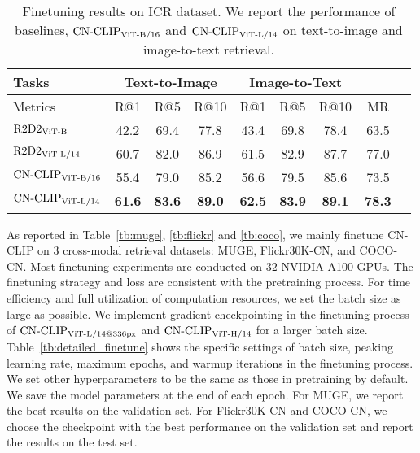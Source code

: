 \documentclass[11pt]{article}
\begin{document}
%
 \begin{table*}[t]
\center
\small
\begin{adjustbox}{max width=1.\textwidth}
\begin{tabular}{@{\extracolsep{\fill}}lcccccccc}
\toprule
  Tasks
  &\multicolumn{3}{c}{Text-to-Image}
  &\multicolumn{3}{c}{Image-to-Text}
  & 
  \\
\midrule
  Metrics & R@1 & R@5 & R@10 & R@1 & R@5 & R@10 & MR
  \\
\midrule
  $\text{R2D2}\rm_{ViT\text{-}B}$
  & 42.2    & 69.4  & 77.8	& 43.4	& 69.8	& 78.4 & 63.5
  \\
  $\text{R2D2}\rm_{ViT\text{-}L/14}$
  & 60.7    & 82.0  & 86.9  & 61.5  & 82.9  & 87.7  & 77.0
  \\
  $\text{CN-CLIP}\rm_{ViT\text{-}B/16}$
  & 55.4    & 79.0  & 85.2  & 56.6  & 79.5  & 85.6  & 73.5
  \\
  $\text{CN-CLIP}\rm_{ViT\text{-}L/14}$
  & \textbf{61.6}    & \textbf{83.6}  & \textbf{89.0}  & \textbf{62.5}  & \textbf{83.9}  & \textbf{89.1}  & \textbf{78.3}
  \\

\bottomrule
\end{tabular}
\end{adjustbox}
\caption{Finetuning results on ICR dataset. We report the performance of baselines, $\text{CN-CLIP}\rm_{ViT\text{-}B/16}$ and $\text{CN-CLIP}\rm_{ViT\text{-}L/14}$ on text-to-image and image-to-text retrieval. }
\label{tb:ICR}
\end{table*} As reported in Table~\ref{tb:muge}, \ref{tb:flickr} and \ref{tb:coco}, we mainly finetune CN-CLIP on $3$ cross-modal retrieval datasets: MUGE, Flickr30K-CN, and COCO-CN.
Most finetuning experiments are conducted on $32$ NVIDIA A100 GPUs.
The finetuning strategy and loss are consistent with the pretraining process.
For time efficiency and full utilization of computation resources, we set the batch size as large as possible.
We implement gradient checkpointing in the finetuning process of $\text{CN-CLIP}\rm_{ViT\text{-}L/14@336px}$ and $\text{CN-CLIP}\rm_{ViT\text{-}H/14}$ for a larger batch size.
Table~\ref{tb:detailed_finetune} shows the specific settings of batch size, peaking learning rate, maximum epochs, and warmup iterations in the finetuning process.
We set other hyperparameters to be the same as those in pretraining by default.
We save the model parameters at the end of each epoch.
For MUGE, we report the best results on the validation set.
For Flickr30K-CN and COCO-CN, we choose the checkpoint with the best performance on the validation set and report the results on the test set.
\end{document}
